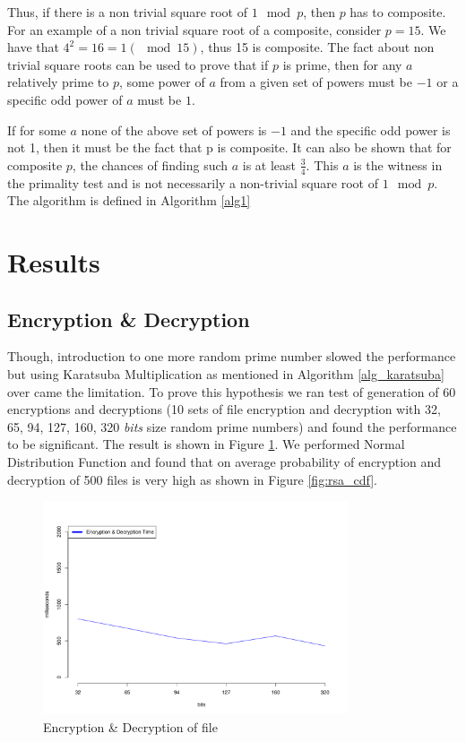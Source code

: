 \documentclass[12pt,journal,compsoc]{IEEEtran}
\begin{document}
Thus, if there is a non trivial square root of $1 \mod p$, then $p$ has to composite. For an example of a non trivial square root of a composite, consider $p = 15$. We have that $4^{2} = 16 = 1 (\mod 15)$, thus 15 is composite. The fact about non trivial square roots can be used to prove that if $p$ is prime, then for any $a$ relatively prime to $p$, some power of $a$ from a given set of powers must be $-1$ or a specific odd power of $a$ must be $1$.


If for some $a$ none of the above set of powers is $-1$ and the specific odd power is not 1, then it must be the fact that p is composite. It can also be shown that for composite $p$, the chances of finding such $a$ is at least $\frac{3}{4}$. This $a$ is the witness in the primality test and is not necessarily a non-trivial square root of $1 \mod p$. The algorithm is defined in Algorithm \ref{alg1}


%	
 
\section{{Results}}


\subsection{{Encryption \& Decryption}}

Though, introduction to one more random prime number slowed the performance but using Karatsuba Multiplication as mentioned in Algorithm \ref{alg_karatsuba} over came the limitation. To prove this hypothesis we ran test of generation of 60 encryptions and decryptions (10 sets of file encryption and decryption with 32, 65, 94, 127, 160, 320 \emph{bits} size random prime numbers) and found the performance to be significant. The result is shown in Figure \ref{fig:rsa_time}. We performed Normal Distribution Function and found that on average probability of encryption and decryption of 500 files is very high as shown in Figure \ref{fig:rsa_cdf}.

\begin{figure}[ht!]
\centering
\includegraphics[width=90mm]{images/encryptionTime.pdf}
\caption{Encryption \& Decryption of file}
\label{fig:rsa_time}
\end{figure}
\end{document}
